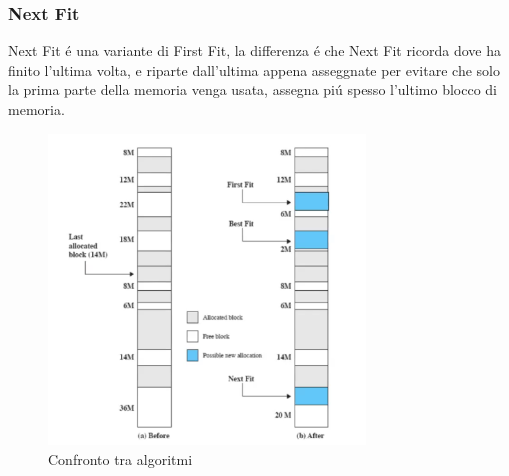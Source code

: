     \subsubsection{Next Fit}
    Next Fit é una variante di First Fit, la differenza é che Next Fit ricorda dove ha finito l'ultima volta, e riparte
    dall'ultima appena asseggnate per evitare che solo la prima parte della memoria venga usata, assegna piú spesso
    l'ultimo blocco di memoria.
    \begin{figure}[H]
        \centering
        \includegraphics[width=0.75\textwidth]{immagini/AlgoritmiPartizionamento}
        \caption{Confronto tra algoritmi}
    \end{figure}

    




